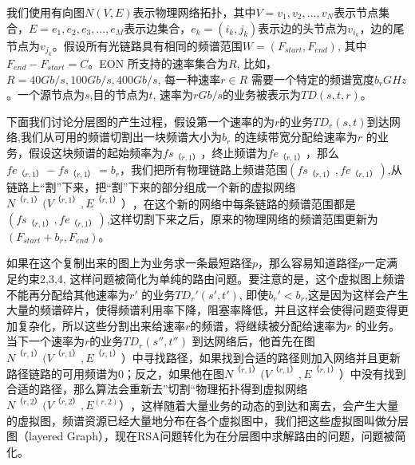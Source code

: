 我们使用有向图$N(V,E)$表示物理网络拓扑，其中$V={v_1,v_2,...,v_N}$表示节点集合，$E={e_1,e_2,e_3,...,e_M}$表示边集合，$e_k=(i_k,j_k)$表示边的头节点为$v_{i_k}$，边的尾节点为$v_{j_k}$。假设所有光链路具有相同的频谱范围$W=(F_{start},F_{end})$, 其中$F_{end}-F_{start}=C$。EON 所支持的速率集合为$R$, 比如，$R={40Gb/s,100Gb/s,400Gb/s}$, 每一种速率$r\in R$ 需要一个特定的频谱宽度$b_r GHz$。一个源节点为$s$,目的节点为$t$, 速率为$r Gb/s$的业务被表示为$TD(s,t,r)$。
  
下面我们讨论分层图的产生过程，假设第一个速率的为$r$的业务$TD_r(s,t)$到达网络,我们从可用的频谱切割出一块频谱大小为$b_r$ 的连续带宽分配给速率为$r$ 的业务，假设这块频谱的起始频率为$fs_{（r,1）}$，终止频谱为$fe_{（r,1）}$，那么$fe_{（r,1）}-fs_{（r,1）}=b_r$，我们把所有物理链路上频谱范围$(fs_{（r,1）},fe_{（r,1）})$,从链路上“割”下来，把“割”下来的部分组成一个新的虚拟网络$N^{（r,1）} (V^{（r,1）},E^{（r,1）}）$，在这个新的网络中每条链路的频谱范围都是$(fs_{（r,1）},fe_{（r,1）})$,这样切割下来之后，原来的物理网络的频谱范围更新为$(F_{start}+b_r,F_{end})$。
  
如果在这个复制出来的图上为业务求一条最短路径$p$，那么容易知道路径$p$一定满足约束2,3,4, 这样问题被简化为单纯的路由问题。要注意的是，这个虚拟图上频谱不能再分配给其他速率为$r'$ 的业务$TD_r'(s',t')$, 即使$b_r'<b_r$,这是因为这样会产生大量的频谱碎片，使得频谱利用率下降，阻塞率降低，并且这样会使得问题变得更加复杂化，所以这些分割出来给速率$r$的频谱，将继续被分配给速率为$r$ 的业务。当下一个速率为$r$的业务$TD_r (s'',t'')$ 到达网络后，他首先在图$N^{ （r,1）}(V^{（r,1）},E^{（r,1）}）$中寻找路径，如果找到合适的路径则加入网络并且更新路径链路的可用频谱为0；反之，如果他在图$N^{（r,1）} (V^{（r,1）},E^{（r,1）}）$中没有找到合适的路径，那么算法会重新去”切割“物理拓扑得到虚拟网络$N^{（r,2）} (V^{（r,2）},E^{(r,2)}）$，这样随着大量业务的动态的到达和离去，会产生大量的虚拟图，频谱资源已经大量地分布在各个虚拟图中，我们把这些虚拟图叫做分层图（layered Graph），现在RSA问题转化为在分层图中求解路由的问题，问题被简化。
  
